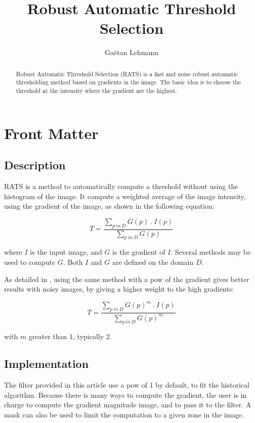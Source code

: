\documentclass{InsightArticle}
\title{Robust Automatic Threshold Selection}
\author{Ga\"etan Lehmann}
\begin{document}
\maketitle

\ifhtml
\chapter*{Front Matter\label{front}}
\fi


\begin{abstract}
\noindent
Robust Automatic Threshold Selection (RATS) \cite{Kitler1985} is a fast and noise robust
automatic thresholding method based on gradients in the image. The basic idea is to choose
the threshold at the intensity where the gradient are the highest.
\end{abstract}


\section{Description}

RATS is a method to automatically compute a threshold without using the histogram of
the image. It compute a weighted average of the image intensity, using the gradient
of the image, as shown in the following equation:

$$
T = \frac{\sum\limits_{p~in~D}G(p)~.~I(p)}{\sum\limits_{p~in~D}G(p)}
$$

where $I$ is the input image, and $G$ is the gradient of $I$. Several methods may
be used to compute $G$. Both $I$ and $G$ are defined on the domain $D$.

As detailed in \cite{Wilkison98}, using the same method with a pow of the gradient
gives better results with noisy images, by giving a higher weight to the high gradients:

$$
T = \frac{\sum\limits_{p~in~D}G(p)^m~.~I(p)}{\sum\limits_{p~in~D}G(p)^m}
$$

with $m$ greater than $1$, typically $2$.



\section{Implementation}

The filter provided in this article use a pow of 1 by default, to fit the historical algorithm.
Because there is many ways to compute the gradient, the user is in charge to compute the gradient
magnitude image, and to pass it to the filter.
A mask can also be used to limit the computation to a given zone in the image.
\end{document}
